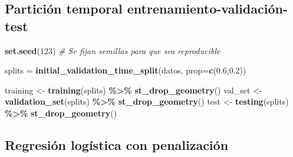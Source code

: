 \documentclass[12pt,a4paper,]{book}
\newenvironment{Shaded}{\begin{snugshade}}{\end{snugshade}}
\newcommand{\AttributeTok}[1]{\textcolor[rgb]{0.13,0.29,0.53}{#1}}
\newcommand{\CommentTok}[1]{\textcolor[rgb]{0.56,0.35,0.01}{\textit{#1}}}
\newcommand{\DecValTok}[1]{\textcolor[rgb]{0.00,0.00,0.81}{#1}}
\newcommand{\FloatTok}[1]{\textcolor[rgb]{0.00,0.00,0.81}{#1}}
\newcommand{\FunctionTok}[1]{\textcolor[rgb]{0.13,0.29,0.53}{\textbf{#1}}}
\newcommand{\NormalTok}[1]{#1}
\newcommand{\OtherTok}[1]{\textcolor[rgb]{0.56,0.35,0.01}{#1}}
\newcommand{\SpecialCharTok}[1]{\textcolor[rgb]{0.81,0.36,0.00}{\textbf{#1}}}
\numberwithin{dummy}{section}
\theoremstyle{ocrenumbox}
\theoremstyle{blacknumex}
\theoremstyle{blacknumbox}
\theoremstyle{ocrenum}
\theoremstyle{ocrenum}
\begin{document}
\hypertarget{particiuxf3n-temporal-entrenamiento-validaciuxf3n-test}{%
\subsection{Partición temporal
entrenamiento-validación-test}\label{particiuxf3n-temporal-entrenamiento-validaciuxf3n-test}}

\begin{Shaded}
\begin{Highlighting}[]
\FunctionTok{set.seed}\NormalTok{(}\DecValTok{123}\NormalTok{) }\CommentTok{\# Se fijan semillas para que sea reproducible}

\NormalTok{splits }\OtherTok{=} \FunctionTok{initial\_validation\_time\_split}\NormalTok{(datos, }
                                       \AttributeTok{prop=}\FunctionTok{c}\NormalTok{(}\FloatTok{0.6}\NormalTok{,}\FloatTok{0.2}\NormalTok{))}

\NormalTok{training }\OtherTok{\textless{}{-}} \FunctionTok{training}\NormalTok{(splits) }\SpecialCharTok{\%\textgreater{}\%}  \FunctionTok{st\_drop\_geometry}\NormalTok{()}
\NormalTok{val\_set }\OtherTok{\textless{}{-}} \FunctionTok{validation\_set}\NormalTok{(splits) }\SpecialCharTok{\%\textgreater{}\%} \FunctionTok{st\_drop\_geometry}\NormalTok{()}
\NormalTok{test  }\OtherTok{\textless{}{-}} \FunctionTok{testing}\NormalTok{(splits) }\SpecialCharTok{\%\textgreater{}\%} \FunctionTok{st\_drop\_geometry}\NormalTok{()}
\end{Highlighting}
\end{Shaded}

\hypertarget{regresiuxf3n-loguxedstica-con-penalizaciuxf3n}{%
\subsection{Regresión logística con
penalización}\label{regresiuxf3n-loguxedstica-con-penalizaciuxf3n}}
\end{document}
